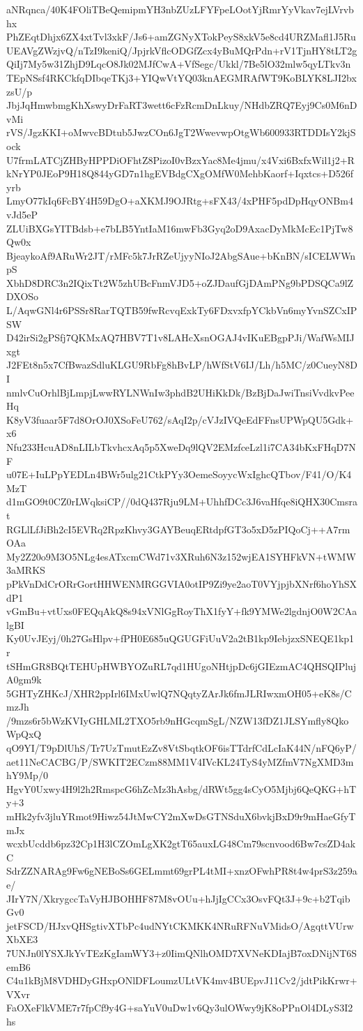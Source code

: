 aNRqnca/40K4FOliTBeQemipmYH3nbZUzLFYFpeLOotYjRmrYyVkav7ejLVrvbhx
PhZEqtDhjx6ZX4xtTvl3xkF/Js6+amZGNyXTokPeyS8xkV5e8cd4URZMafl1J5Ru
UEAVgZWzjvQ/nTzI9keniQ/JpjrkVflcODGfZcx4yBuMQrPdn+rV1TjnHY8tLT2g
QiIj7My5w31ZhjD9LqcO8Jk02MJfCwA+VfSegc/Ukkl/7Be5lO32mlw5qyLTkv3n
TEpNSsf4RKCkfqDIbqeTKj3+YIQwVtYQ03knAEGMRAfWT9KoBLYK8LJI2bxzsU/p
JbjJqHmwbmgKhXswyDrFaRT3wett6cFzRcmDnLkuy/NHdbZRQ7Eyj9Cs0M6nDvMi
rVS/JgzKKI+oMwvcBDtub5JwzCOn6JgT2WwevwpOtgWb600933RTDDIsY2kjSock
U7frmLATCjZHByHPPDiOFhtZ8PizoI0vBzxYac8Me4jmu/x4Vxi6BxfxWil1j2+R
kNrYP0JEoP9H18Q844yGD7n1hgEVBdgCXgOMfW0MehbKaorf+Iqxtcs+D526fyrb
LmyO77kIq6FcBY4H59DgO+aXKMJ9OJRtg+sFX43/4xPHF5pdDpHqyONBm4vJd5eP
ZLUiBXGsYITBdsb+e7bLB5YntIaM16mwFb3Gyq2oD9AxacDyMkMcEc1PjTw8Qw0x
BjeaykoAf9ARuWr2JT/rMFc5k7JrRZeUjyyNIoJ2AbgSAue+bKnBN/sICELWWnpS
XbhD8DRC3n2IQixTt2W5zhUBcFnmVJD5+oZJDaufGjDAmPNg9bPDSQCa9lZDXOSo
L/AqwGNl4r6PSSr8RarTQTB59fwRcvqExkTy6FDxvxfpYCkbVn6myYvnSZCxIPSW
D42irSi2gPSfj7QKMxAQ7HBV7T1v8LAHcXsnOGAJ4vIKuEBgpPJi/WafWsMIJxgt
J2FEt8n5x7CfBwazSdluKLGU9RbFg8hBvLP/hWfStV6IJ/Lh/h5MC/z0CueyN8DI
nmlvCuOrhlBjLmpjLwwRYLNWnIw3phdB2UHiKkDk/BzBjDaJwiTnsiVvdkvPeeHq
K8yV3fuaar5F7d8OrOJ0XSoFeU762/sAqI2p/cVJzIVQeEdFFnsUPWpQU5Gdk+x6
Nfu233HcuAD8nLILbTkvhcxAq5p5XweDq9lQV2EMzfceLzl1i7CA34bKxFHqD7NF
u07E+IuLPpYEDLn4BWr5ulg21CtkPYy3OemeSoyycWxIghcQTbov/F41/O/K4MzT
d1mGO9t0CZ0rLWqksiCP//0dQ437Rju9LM+UhhfDCc3J6vaHfqe8iQHX30Cmsrat
RGLlLfJiBh2cI5EVRq2RpzKhvy3GAYBeuqERtdpfGT3o5xD5zPIQoCj++A7rmOAa
My2Z20o9M3O5NLg4esATxcmCWd71v3XRuh6N3z152wjEA1SYHFkVN+tWMW3aMRKS
pPkVnDdCrORrGortHHWENMRGGVIA0otIP9Zi9ye2aoT0VYjpjbXNrf6hoYhSXdP1
vGmBu+vtUxs0FEQqAkQ8s94xVNlGgRoyThX1fyY+fk9YMWe2lgdnjO0W2CAalgBI
Ky0UvJEyj/0h27GsHlpv+fPH0E685uQGUGFiUuV2a2tB1kp9IebjzxSNEQE1kp1r
tSHmGR8BQtTEHUpHWBYOZuRL7qd1HUgoNHtjpDc6jGIEzmAC4QHSQIPlujA0gm9k
5GHTyZHKcJ/XHR2ppIrl6IMxUwlQ7NQqtyZArJk6fmJLRIwxmOH05+eK8s/CmzJh
/9mzs6r5bWzKVIyGHLML2TXO5rb9nHGcqmSgL/NZW13fDZ1JLSYmfly8QkoWpQxQ
qO9YI/T9pDlUhS/Tr7UzTmutEzZv8VtSbqtkOF6isTTdrfCdLcIaK44N/nFQ6yP/
aet11NeCACBG/P/SWKIT2ECzm88MM1V4IVcKL24TyS4yMZfmV7NgXMD3mhY9Mp/0
HgvY0Uxwy4H9l2h2RmspcG6hZcMz3hAsbg/dRWt5gg4sCyO5Mjbj6QeQKG+hTy+3
mHk2yfv3jluYRmot9Hiwz54JtMwCY2mXwDsGTNSduX6bvkjBxD9r9mHaeGfyTmJx
wcxbUcddb6pz32Cp1H3lCZOmLgXK2gtT65auxLG48Cm79scnvood6Bw7csZD4akC
SdrZZNARAg9Fw6gNEBoSs6GELmmt69grPL4tMI+xnzOFwhPR8t4w4prS3z259ae/
JIrY7N/XkrygccTaVyHJBOHHF87M8vOUu+hJjIgCCx3OsvFQt3J+9c+b2TqibGv0
jetFSCD/HJxvQHSgtivXTbPc4udNYtCKMKK4NRuRFNuVMidsO/AgqttVUrwXbXE3
7UNJn0lYSXJkYvTEzKgIamWY3+z0IimQNlhOMD7XVNeKDIajB7oxDNijNT6SemB6
C4u1kBjM8VDHDyGHxpONlDFLoumzULtVK4mv4BUEpvJ11Cv2/jdtPikKrwr+VXvr
FaOXeFlkVME7r7fpCf9y4G+saYuV0uDw1v6Qy3ulOWwy9jK8oPPnOl4DLyS3I2hs
